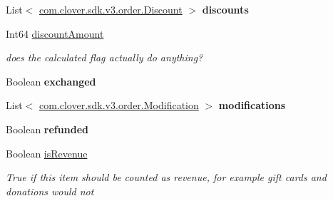 \begin{DoxyCompactItemize}
List$<$ \hyperlink{classcom_1_1clover_1_1sdk_1_1v3_1_1order_1_1_discount}{com.\+clover.\+sdk.\+v3.\+order.\+Discount} $>$ {\bfseries discounts}
\item 
Int64 \hyperlink{classcom_1_1clover_1_1sdk_1_1v3_1_1order_1_1_line_item_aaf7ca9189ecde44c059eed82bcfd0c79}{discount\+Amount}
\begin{DoxyCompactList}\small\item\em does the calculated flag actually do anything? \end{DoxyCompactList}\item 
\mbox{\label{classcom_1_1clover_1_1sdk_1_1v3_1_1order_1_1_line_item_a9ced72773ee611e1ccc95177a2a31f86}} 
Boolean {\bfseries exchanged}
\item 
\mbox{\label{classcom_1_1clover_1_1sdk_1_1v3_1_1order_1_1_line_item_a01fe5e70f36a74a944c5d7d71b29e62a}} 
List$<$ \hyperlink{classcom_1_1clover_1_1sdk_1_1v3_1_1order_1_1_modification}{com.\+clover.\+sdk.\+v3.\+order.\+Modification} $>$ {\bfseries modifications}
\item 
\mbox{\label{classcom_1_1clover_1_1sdk_1_1v3_1_1order_1_1_line_item_ae7792bf5ce3b06c0bccbfc69d96f8f5a}} 
Boolean {\bfseries refunded}
\item 
Boolean \hyperlink{classcom_1_1clover_1_1sdk_1_1v3_1_1order_1_1_line_item_a287202191b4ff40b5234589dd8071431}{is\+Revenue}
\begin{DoxyCompactList}\small\item\em True if this item should be counted as revenue, for example gift cards and donations would not \end{DoxyCompactList}\item 
\mbox{\label{classcom_1_1clover_1_1sdk_1_1v3_1_1order_1_1_line_item_aac4d7e3fea611b0a54dff02492658ac4}} 

\end{DoxyCompactItemize}
